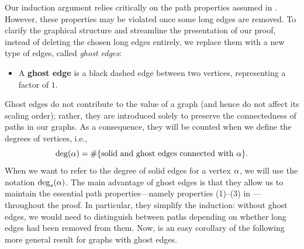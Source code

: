Our induction argument relies critically on the path properties assumed in . However, these properties may be violated once some long edges are removed. To clarify the graphical structure and streamline the presentation of our proof, instead of deleting the chosen long edges entirely, we replace them with a new type of edges, called \emph{ghost edges}:
\begin{itemize}
\item A {\bf ghost edge} is a black dashed edge between two vertices, representing a factor of $1$. 
\end{itemize}
Ghost edges do not contribute to the value of a graph (and hence do not affect its scaling order); rather, they are introduced solely to preserve the connectedness of paths in our graphs. As a consequence, they will be counted when we define the degrees of vertices, i.e., 
\[ \deg(\alpha)=\#\{\text{solid and ghost edges connected with }\alpha\}.\]
When we want to refer to the degree of solid edges for a vertex $\alpha$, we will use the notation $\deg_s(\alpha)$.  
The main advantage of ghost edges is that they allow us to maintain the essential path properties---namely properties (1)--(3) in ---throughout the proof. In particular, they simplify the induction: without ghost edges, we would need to distinguish between paths depending on whether long edges had been removed from them. 
Now,  is an easy corollary of the following more general result for graphs with ghost edges. 



